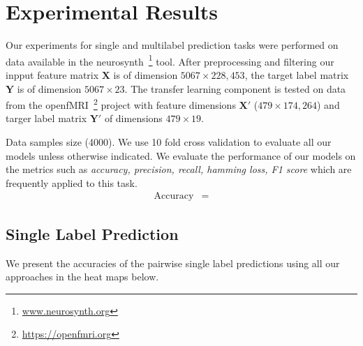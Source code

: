 \documentclass{article} %
\begin{document}
\section{Experimental Results}
Our experiments for single and multilabel prediction tasks were performed on data available in the neurosynth~\footnote{\protect \url{www.neurosynth.org}} tool. After preprocessing and filtering our inpput feature matrix  $\mathbf{X}$ is of dimension $5067 \times 228,453$, the target label matrix $\mathbf{Y}$ is of dimension $5067 \times 23$. The transfer learning component is tested on data from the openfMRI~\footnote{\protect \url{https://openfmri.org}} project with feature dimensions $\mathbf{X}'$ ($479 \times 174,264$) and targer label matrix $\mathbf{Y}'$ of dimensions $479 \times 19$.

Data samples size (4000). We use 10 fold cross validation to evaluate all our models unless otherwise indicated. We evaluate the performance of our models on the metrics such as \textit{accuracy, precision, recall, hamming loss, F1 score} which are frequently applied to this task.
\begin{align*}
 \text{Accuracy} &= 
\end{align*}

 \subsection{Single Label Prediction}
 We present the accuracies of the pairwise single label predictions using all our approaches in the heat maps below.
\end{document}
